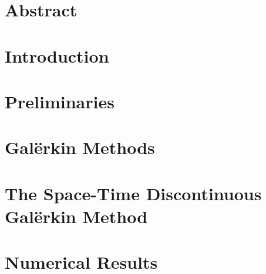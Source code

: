 
\chapter*{Abstract}
\thispagestyle{fancy}



\newpage
\tableofcontents
\thispagestyle{fancy}



\newpage
\chapter{Introduction}
\thispagestyle{fancy}





\newpage
\chapter{Preliminaries}
\thispagestyle{fancy}




\newpage
\chapter{Galërkin Methods}
\thispagestyle{fancy}


\newpage
\chapter{The Space-Time Discontinuous Galërkin Method}
\thispagestyle{fancy}




\newpage
\chapter{Numerical Results}
\thispagestyle{fancy}





\newpage
{}

\printbibliography
\thispagestyle{fancy}
